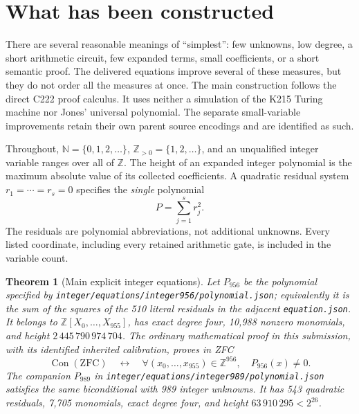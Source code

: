 \documentclass[11pt,letterpaper]{article}
\newtheorem{theorem}{Theorem}[section]
\theoremstyle{definition}
\theoremstyle{remark}
\newcommand{\N}{\mathbb N}
\newcommand{\Z}{\mathbb Z}
\newcommand{\Con}{\operatorname{Con}}
\newcommand{\ZFC}{\mathrm{ZFC}}
\newcommand{\file}[1]{\nolinkurl{#1}}
\begin{document}
\section{What has been constructed}
\label{sec:results}

There are several reasonable meanings of ``simplest'': few unknowns,
low degree, a short arithmetic circuit, few expanded terms, small
coefficients, or a short semantic proof. The delivered equations improve
several of these measures, but they do not order all the measures at once.
The main construction follows the direct C222 proof calculus. It uses
neither a simulation of the K215 Turing machine nor Jones' universal
polynomial. The separate small-variable improvements retain their own
parent source encodings and are identified as such.

Throughout, $\N=\{0,1,2,\ldots\}$, $\Z_{>0}=\{1,2,\ldots\}$,
and an unqualified integer variable ranges over all of $\Z$.
The height of an expanded integer polynomial is the maximum absolute
value of its collected coefficients. A quadratic residual system
$r_1=\cdots=r_s=0$ specifies the \emph{single} polynomial
\begin{equation}\label{eq:sos-definition}
                         P=\sum_{j=1}^{s}r_j^2.
\end{equation}
The residuals are polynomial abbreviations, not additional unknowns.
Every listed coordinate, including every retained arithmetic gate, is
included in the variable count.

\begin{theorem}[Main explicit integer equations]\label{thm:main}
Let $P_{956}$ be the polynomial specified by
\file{integer/equations/integer956/polynomial.json}; equivalently it is
the sum of the squares of the 510 literal residuals in the adjacent
\file{equation.json}. It belongs to $\Z[X_0,\ldots,X_{955}]$, has exact
degree four, 10,988 nonzero monomials, and height
$2\,445\,790\,974\,704$. The ordinary mathematical proof in this
submission, with its identified inherited calibration, proves in ZFC
\begin{equation}\label{eq:main-con}
 \Con(\ZFC)\quad\longleftrightarrow\quad
 \forall (x_0,\ldots,x_{955})\in\Z^{956},\quad P_{956}(x)\ne0.
\end{equation}
The companion $P_{989}$ in
\file{integer/equations/integer989/polynomial.json} satisfies the same
biconditional with 989 integer unknowns. It has 543 quadratic residuals,
7,705 monomials, exact degree four, and height $63\,910\,295<2^{26}$.
\end{theorem}
\end{document}
